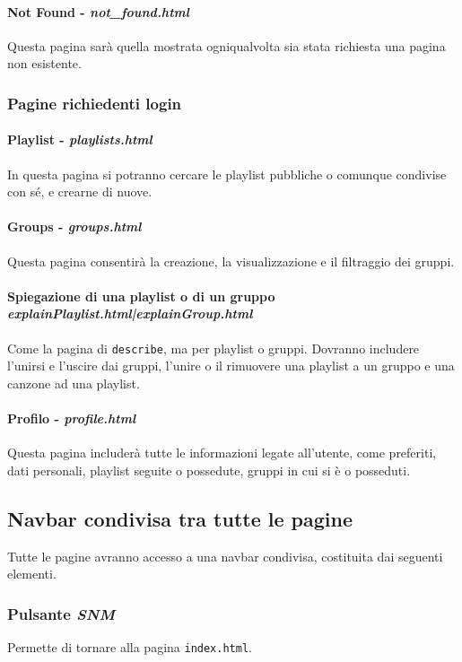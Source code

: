 \paragraph{Not Found - \textit{not\_found.html}}
Questa pagina sarà quella mostrata ogniqualvolta sia stata richiesta una pagina non esistente.

\subsubsection{Pagine richiedenti login}
\paragraph{Playlist - \textit{playlists.html}}
In questa pagina si potranno cercare le playlist pubbliche o comunque condivise con sé, e crearne di nuove.

\paragraph{Groups - \textit{groups.html}}
Questa pagina consentirà la creazione, la visualizzazione e il filtraggio dei gruppi.

\paragraph{Spiegazione di una playlist o di un gruppo \textit{explainPlaylist.html|explainGroup.html}}
Come la pagina di \verb|describe|, ma per playlist o gruppi. Dovranno includere l'unirsi e l'uscire dai gruppi, l'unire o il rimuovere una playlist a un gruppo e una canzone ad una playlist.
\paragraph{Profilo - \textit{profile.html}}
Questa pagina includerà tutte le informazioni legate all'utente, come preferiti, dati personali, playlist seguite o possedute, gruppi in cui si è o posseduti.


\subsection{Navbar condivisa tra tutte le pagine}
Tutte le pagine avranno accesso a una navbar condivisa, costituita dai seguenti elementi.
\subsubsection{Pulsante \textit{SNM}}
Permette di tornare alla pagina \verb|index.html|.
